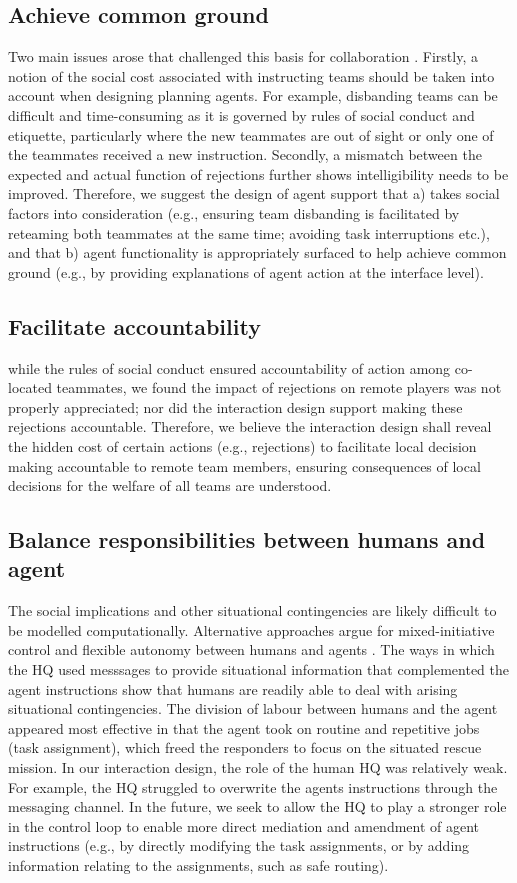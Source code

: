 \subsection{Achieve common ground}  
Two main issues arose that challenged this basis for collaboration \cite{Bradshaw2011}. Firstly, a notion of the social cost associated with instructing teams should be taken into account when designing planning agents. For example, disbanding teams can be difficult and time-consuming as it is governed by rules of social conduct and etiquette, particularly where the new teammates are out of sight or only one of the teammates received a new instruction. Secondly, a mismatch between the expected and actual function of rejections further shows intelligibility needs to be improved. Therefore, we suggest the design of agent support that a) takes social factors into consideration (e.g., ensuring team disbanding is facilitated by reteaming both teammates at the same time; avoiding task interruptions etc.), and that b) agent functionality is appropriately surfaced to help achieve common ground (e.g., by providing explanations of agent action at the interface level).

\subsection{Facilitate accountability}
while the rules of social conduct ensured accountability of action among co-located teammates, we found the impact of rejections on remote players was not properly appreciated; nor did the interaction design support making these rejections accountable. Therefore, we believe the interaction design shall reveal the hidden cost of certain actions (e.g., rejections) to facilitate local decision making accountable to remote team members, ensuring consequences of local decisions for the welfare of all teams are understood. 

\subsection{Balance responsibilities between humans and agent}\label{sec:balanceResponsibility}
 The social implications and other situational contingencies are likely difficult to be modelled computationally. Alternative approaches argue for mixed-initiative  control and flexible autonomy between humans and agents \cite{Bradshaw2011}. The ways in which the HQ used messsages to provide situational information that complemented the agent instructions show that humans are readily able to deal with arising situational contingencies. The division of labour between humans and the agent appeared most effective in that the agent took on routine and repetitive jobs (task assignment), which freed the responders to focus on the situated rescue mission. In our interaction design, the role of the human HQ was relatively weak. For example, the HQ struggled to overwrite the agents instructions through the messaging channel. In the future, we seek to allow the HQ to play a stronger role in the control loop to enable more direct mediation and amendment of agent instructions (e.g., by directly modifying the task assignments, or by adding information relating to the assignments, such as safe routing).
 
